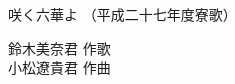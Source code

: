 \documentclass[10pt,b5j]{tarticle} %
\begin{document}
\begin{minipage}[c]{0.7\hsize} %
    \begin{center}
        {\LARGE
            咲く六華よ %
        }
        {\small 
            （平成二十七年度寮歌） %
        }
    \end{center}
\end{minipage}
\begin{minipage}[c]{0.3\hsize} %
    \begin{flushright} %
        鈴木美奈君 作歌\\小松遼貴君 作曲 %
    \end{flushright}
\end{minipage}
\end{document}
